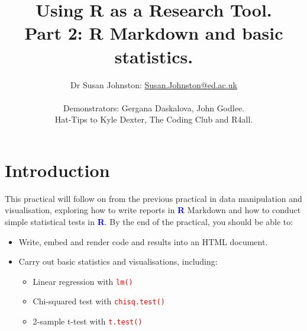\documentclass[a4paper,12pt]{article}
\newcommand\boldblue[1]{\textcolor{blue}{\textbf{#1}}}
\newcommand\code[1]{\textcolor{red}{\texttt{#1}}}
\begin{document}





\title{Using R as a Research Tool.\\
Part 2: R Markdown and basic statistics.}
\author{Dr Susan Johnston: \href{mailto:Susan.Johnston@ed.ac.uk}{Susan.Johnston@ed.ac.uk}  \\ \\
        Demonstrators: Gergana Daskalova, John Godlee. \\
        Hat-Tips to Kyle Dexter, The Coding Club and R4all.}











\maketitle



\section {Introduction}

This practical will follow on from the previous practical in data manipulation and visualisation, exploring how to write reports in \boldblue{R} Markdown and how to conduct simple statistical tests in \boldblue{R}. By the end of the practical, you should be able to:

\begin{itemize}

\item Write, embed and render code and results into an HTML document.

\item Carry out basic statistics and visualisations, including:

\begin{itemize}

\item Linear regression with \code{lm()}
\item Chi-squared test with \code{chisq.test()}
\item 2-sample t-test with \code{t.test()}


\end{itemize}

\end{itemize}
\end{document}
